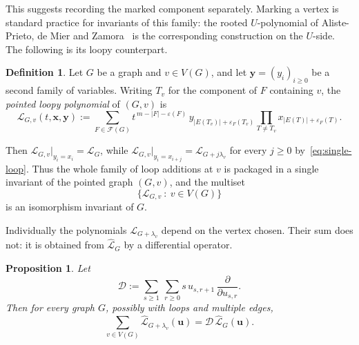 \documentclass[11pt]{article}
\theoremstyle{plain}
\newtheorem{proposition}[theorem]{Proposition}
\theoremstyle{definition}
\newtheorem{definition}[theorem]{Definition}
\renewcommand{\mathcal}{\mathscr}
\newcommand{\LL}{\mathcal{L}}    %
\newcommand{\cF}{\mathcal{F}}    %
\newcommand{\cD}{\mathcal{D}}
\newcommand{\bu}{\mathbf{u}}
\newcommand{\bx}{\mathbf{x}}
\newcommand{\by}{\mathbf{y}}
\newcommand{\eps}{\varepsilon}
\numberwithin{equation}{section}
\begin{document}
This suggests recording the marked component separately.  Marking a vertex is
standard practice for invariants of this family: the rooted $U$-polynomial of
Aliste-Prieto, de Mier and Zamora~\cite{ADZ} is the corresponding
construction on the $U$-side.  The following is its loopy counterpart.

\begin{definition}\label{def:pointed-loopy}
Let $G$ be a graph and $v\in V(G)$, and let $\by=(y_i)_{i\ge 0}$ be a
second family of variables.  Writing $T_v$ for the component of $F$
containing $v$, the \emph{pointed loopy polynomial} of $(G,v)$ is
\begin{equation}\label{eq:pointed-loopy}
   \LL_{G,v}(t,\bx,\by)
   :=
   \sum_{F\in\cF(G)}
      t^{\,m-|F|-\eps(F)}\,
      y_{|E(T_v)|+\eps_F(T_v)}
      \prod_{T\ne T_v}x_{|E(T)|+\eps_F(T)} .
\end{equation}
\end{definition}

Then $\LL_{G,v}\big|_{y_i=x_i}=\LL_G$, while
$\LL_{G,v}\big|_{y_i=x_{i+j}}=\LL_{G+j\lambda_v}$ for every $j\ge 0$
by~\eqref{eq:single-loop}.  Thus the whole family of loop additions at $v$
is packaged in a single invariant of the pointed graph $(G,v)$, and the
multiset
\[
   \bigl\{\LL_{G,v}\ :\ v\in V(G)\bigr\}
\]
is an isomorphism invariant of $G$.

Individually the polynomials $\LL_{G+\lambda_v}$ depend on the vertex
chosen.  Their sum does not: it is obtained from $\widehat{\LL}_G$ by a
differential operator.

\begin{proposition}\label{prop:loop-derivation}
Let
\[
   \cD
   :=
   \sum_{s\ge 1}\ \sum_{r\ge 0}
      s\,u_{s,r+1}\,\frac{\partial}{\partial u_{s,r}} .
\]
Then for every graph $G$, possibly with loops and multiple edges,
\begin{equation}\label{eq:loop-derivation}
   \sum_{v\in V(G)}\widehat{\LL}_{G+\lambda_v}(\bu)
   =
   \cD\,\widehat{\LL}_G(\bu).
\end{equation}
\end{proposition}
\end{document}
